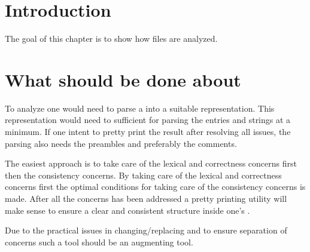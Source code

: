 
\section{Introduction}
The goal of this chapter is to show how {\bibtex} files are analyzed.

\section{What should be done about {\bibtex}}

To analyze {\bibtex} one would need to parse a  into a
suitable representation.  This representation would need to sufficient
for parsing the {\bibtex} entries and strings at a minimum.  If one
intent to pretty print the result after resolving all issues, the
parsing also needs the preambles and preferably the comments.

The easiest approach is to take care of the lexical and correctness
concerns first then the consistency concerns.  By taking care of the
lexical and correctness concerns first the optimal conditions for
taking care of the consistency concerns is made.  After all the
concerns has been addressed a pretty printing utility will make sense
to ensure a clear and consistent structure inside one's .

Due to the practical issues in changing/replacing {\bibtex} and to
ensure separation of concerns such a tool should be an augmenting
tool.


